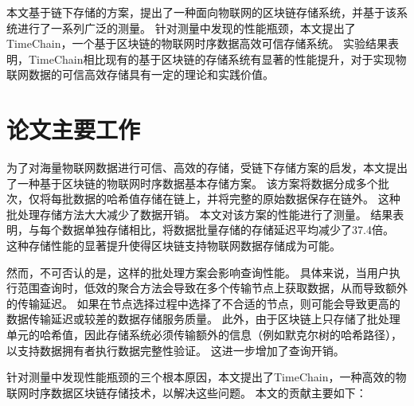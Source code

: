 本文基于链下存储的方案，提出了一种面向物联网的区块链存储系统，并基于该系统进行了一系列广泛的测量。
针对测量中发现的性能瓶颈，本文提出了TimeChain，一个基于区块链的物联网时序数据高效可信存储系统。
实验结果表明，TimeChain相比现有的基于区块链的存储系统有显著的性能提升，对于实现物联网数据的可信高效存储具有一定的理论和实践价值。

\section{论文主要工作}
为了对海量物联网数据进行可信、高效的存储，受链下存储方案的启发，本文提出了一种基于区块链的物联网时序数据基本存储方案。
该方案将数据分成多个批次，仅将每批数据的哈希值存储在链上，并将完整的原始数据保存在链外。
这种批处理存储方法大大减少了数据开销。
本文对该方案的性能进行了测量。
结果表明，与每个数据单独存储相比，将数据批量存储的存储延迟平均减少了37.4倍。
这种存储性能的显著提升使得区块链支持物联网数据存储成为可能。

然而，不可否认的是，这样的批处理方案会影响查询性能。
具体来说，当用户执行范围查询时，低效的聚合方法会导致在多个传输节点上获取数据，从而导致额外的传输延迟。
如果在节点选择过程中选择了不合适的节点，则可能会导致更高的数据传输延迟或较差的数据存储服务质量。
此外，由于区块链上只存储了批处理单元的哈希值，因此存储系统必须传输额外的信息（例如默克尔树的哈希路径），以支持数据拥有者执行数据完整性验证。
这进一步增加了查询开销。

针对测量中发现性能瓶颈的三个根本原因，本文提出了TimeChain，一种高效的物联网时序数据区块链存储技术，以解决这些问题。
本文的贡献主要如下：

